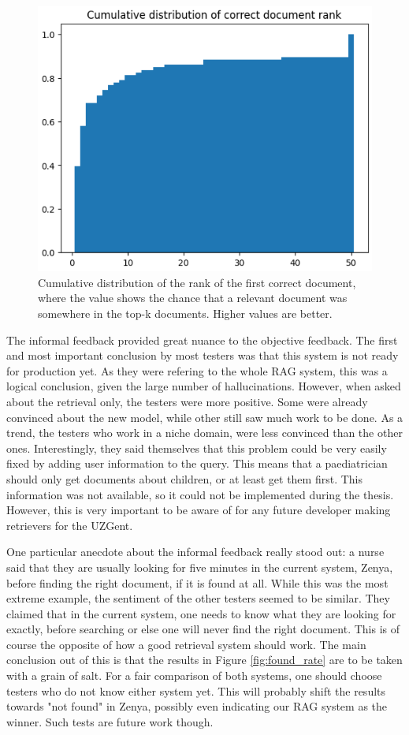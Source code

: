 \begin{figure}[H]
    \captionsetup{justification=centering}
    \centerline{\includegraphics[width=0.7\linewidth]{fig/rag_cumulative_doc_rank.png}}
    \caption{Cumulative distribution of the rank of the first correct document, where the value shows the chance that a relevant document was somewhere in the top-k documents. Higher values are better.}
    \label{fig:chunk_rank_cumulative_distribution}
\end{figure}

The informal feedback provided great nuance to the objective feedback. The first and most important conclusion by most testers was that this system is not ready for production yet. As they were refering to the whole RAG system, this was a logical conclusion, given the large number of hallucinations. However, when asked about the retrieval only, the testers were more positive. Some were already convinced about the new model, while other still saw much work to be done. As a trend, the testers who work in a niche domain, were less convinced than the other ones. Interestingly, they said themselves that this problem could be very easily fixed by adding user information to the query. This means that a paediatrician should only get documents about children, or at least get them first. This information was not available, so it could not be implemented during the thesis. However, this is very important to be aware of for any future developer making retrievers for the UZGent.

One particular anecdote about the informal feedback really stood out: a nurse said that they are usually looking for five minutes in the current system, Zenya, before finding the right document, if it is found at all. While this was the most extreme example, the sentiment of the other testers seemed to be similar. They claimed that in the current system, one needs to know what they are looking for exactly, before searching or else one will never find the right document. This is of course the opposite of how a good retrieval system should work. The main conclusion out of this is that the results in Figure \ref{fig:found_rate} are to be taken with a grain of salt. For a fair comparison of both systems, one should choose testers who do not know either system yet. This will probably shift the results towards "not found" in Zenya, possibly even indicating our RAG system as the winner. Such tests are future work though.

